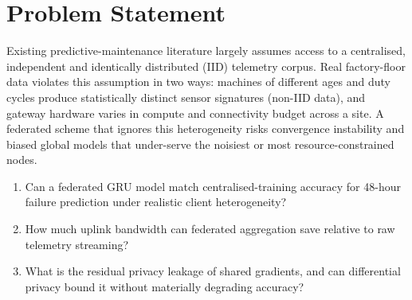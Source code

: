 \section{Problem Statement}
Existing predictive-maintenance literature largely assumes access to a centralised,
independent and identically distributed (IID) telemetry corpus. Real factory-floor data
violates this assumption in two ways: machines of different ages and duty cycles produce
statistically distinct sensor signatures (non-IID data), and gateway hardware varies in
compute and connectivity budget across a site. A federated scheme that ignores this
heterogeneity risks convergence instability and biased global models that under-serve
the noisiest or most resource-constrained nodes.

\begin{tcolorbox}[infobox,title=Research Questions]
\begin{enumerate}[leftmargin=1.4em]
  \item Can a federated GRU model match centralised-training accuracy for 48-hour
        failure prediction under realistic client heterogeneity?
  \item How much uplink bandwidth can federated aggregation save relative to raw
        telemetry streaming?
  \item What is the residual privacy leakage of shared gradients, and can differential
        privacy bound it without materially degrading accuracy?
\end{enumerate}
\end{tcolorbox}
